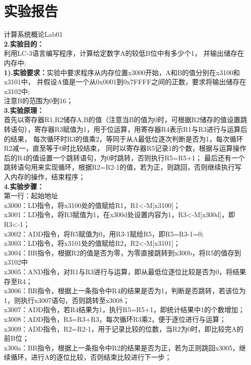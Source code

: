 \documentclass[12pt]{ctexart}
\begin{document}
\section*{实验报告}
计算系统概论Lab01\\
{\bf2.实验目的：}\\
利用LC-3语言编写程序，计算给定数字A的较低B位中有多少个1，
并输出储存在内存中;\\
{\bf1).实验要求：}实验中要求程序从内存位置x3000开始，A和B的值分别在x3100和x3101中，
并假设A值是一个从0x0001到0x7FFFF之间的正数，要求将输出储存在x3102中;\\
注意B的范围为0到16；\\
{\bf3.实验原理：}\\
首先以寄存器R1,R2储存A,B的值（注意当B的值为0时，可根据R2储存的值设置跳转语句），寄存器R3赋值为1，用于位运算，用寄存器R4表示R1与R3进行与运算后的结果，
每次循环时R3的值乘2，等同于从A最低位逐次判断是否为1，每次循环R2减一，直至等于0时比较结束，
同时以寄存器R5记录1的个数，根据与运算操作后的R4的值设置一个跳转语句，为0时跳转，否则执行R5=R5+1；
最后还有一个跳转语句用来实现循环，根据R2=R2-1的值，若为正，则跳回，否则继续执行写入内存的操作，结束程序；\\
{\bf4.实验步骤：}\\
第一行：起始地址\\
x3000：LD指令，将x3100处的值赋给R1，R1<-M[x3100]；\\
x3001：LD指令，将R3赋值为1，在x300d处设置内容为1，R3<-M[x300d]，即R3<-1；\\
x3002：ADD指令，将R5赋值为0，用R3-1赋给R5，即R5=R3-1=0;\\
x3003：LD指令，将x3101处的值赋给R2，R2<-M[x3101]；\\
x3004：BR指令，根据R2的值是否为零，为零直接跳转到x300b，将R5的值存到x3102中\\
x3005：AND指令，对R1与R3进行与运算，即从最低位逐位比较是否为0，将结果存至R4；\\
x3006：BR指令，根据上一条指令中R4的结果是否为1，判断是否跳转，若该位为1，则执行x3007语句，否则跳转至x3008；\\
x3007：ADD指令，若R4结果为1，执行R5=R5+1，即统计结果中1的个数增加；\\
x3008：ADD指令，R3=R3+R3，每次循环R3乘2，便于逐位进行与运算；\\
x3009：ADD指令，R2=R2-1，用于记录比较的位数，当R2为0时，即比较完A的前B位；\\
x300a：BR指令，根据上一条指令中R2的结果是否为正，若为正则跳回x3005，继续循环，进行A的逐位比较，否则结束比较进行下一步；\\
\end{document}
